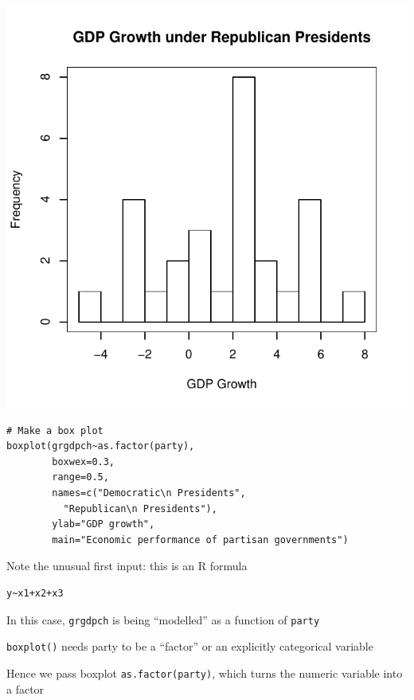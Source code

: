 \documentclass[pdflatex,landscape,titlepage]{foils}
\begin{document}
\begin{center}

\includegraphics[width=7.5 in]{gdphist_rep}

\end{center}

\foilhead[-0.75in]{}
\bgclear

\begin{verbatim}
# Make a box plot
boxplot(grgdpch~as.factor(party),
        boxwex=0.3,
        range=0.5,
        names=c("Democratic\n Presidents",
          "Republican\n Presidents"),
        ylab="GDP growth",
        main="Economic performance of partisan governments")
\end{verbatim}

Note the unusual first input:  this is an R formula
\begin{verbatim}
y~x1+x2+x3
\end{verbatim}

In this case, \texttt{grgdpch} is being ``modelled'' as a function of \texttt{party}

\texttt{boxplot()} needs party to be a ``factor'' or an explicitly categorical variable

Hence we pass boxplot \texttt{as.factor(party)}, which turns the numeric variable into a factor
\end{document}
